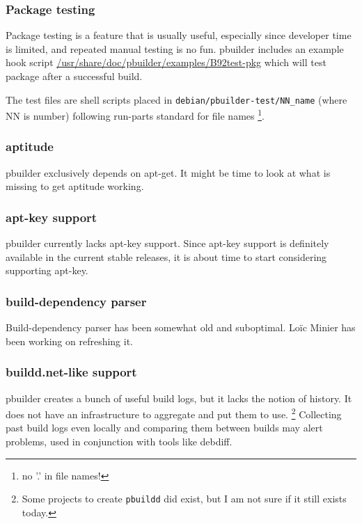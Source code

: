 \documentclass[mingoth,a4paper]{jsarticle}
\begin{document}
{{{{{{{\subsubsection{Package testing}

Package testing is a feature that is usually useful, especially since
developer time is limited, and repeated manual testing is no fun.
pbuilder includes an example hook script
\url{/usr/share/doc/pbuilder/examples/B92test-pkg} which will test
package after a successful build.

The test files are shell scripts placed in
\verb!debian/pbuilder-test/NN_name! (where NN is number) following
run-parts standard for file names \footnote{no '.' in file names!}.

\subsubsection{aptitude}

pbuilder exclusively depends on apt-get.  It might be time to look at
what is missing to get aptitude working.

\subsubsection{apt-key support}

pbuilder currently lacks apt-key support.  Since apt-key support is
definitely available in the current stable releases, it is about time to
start considering supporting apt-key.

\subsubsection{build-dependency parser}

Build-dependency parser has been somewhat old and suboptimal.  Lo\"ic
Minier has been working on refreshing it.

\subsubsection{buildd.net-like support}

pbuilder creates a bunch of useful build logs, but it lacks the notion
of history. It does not have an infrastructure to aggregate and put them
to use.  \footnote{Some projects to create \texttt{pbuildd} did exist,
but I am not sure if it still exists today.  } Collecting past build
logs even locally and comparing them between builds may alert problems,
used in conjunction with tools like debdiff.

}}}}}}}
\end{document}

